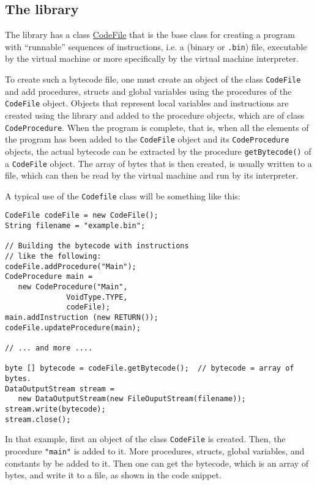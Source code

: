 \documentclass[11pt]{article}
\begin{document}
\subsection{The library}
\label{sec:org5157000}

The library has a class \href{../../../material/oblig2-patch/src/bytecode/CodeFile.java}{CodeFile} that is the base class for creating a
program with ``runnable'' sequences of instructions, i.e. a (binary or
\texttt{.bin}) file, executable by the virtual machine or more specifically by the
virtual machine interpreter.


To create such a bytecode file, one must create an object of the class
\texttt{CodeFile} and add procedures, structs and global variables using the
procedures of the \texttt{CodeFile} object. Objects that represent local variables
and instructions are created using the library and added to the procedure
objects, which are of class \texttt{CodeProcedure}. When the program is complete,
that is, when all the elements of the program has been added to the
\texttt{CodeFile} object and its \texttt{CodeProcedure} objects, the actual bytecode can
be extracted by the procedure \texttt{getBytecode()} of a \texttt{CodeFile} object.  The
array of bytes that is then created, is usually written to a file, which
can then be read by the virtual machine and run by its interpreter.



A typical use of the \texttt{Codefile} class will be something like this:



\lstset{language=java,label= ,caption= ,captionpos=b,numbers=none}
\begin{lstlisting}
CodeFile codeFile = new CodeFile();
String filename = "example.bin";

// Building the bytecode with instructions 
// like the following:
codeFile.addProcedure("Main");
CodeProcedure main = 
   new CodeProcedure("Main",
		      VoidType.TYPE,
		      codeFile);
main.addInstruction (new RETURN());
codeFile.updateProcedure(main);

// ... and more ....

byte [] bytecode = codeFile.getBytecode();  // bytecode = array of bytes.
DataOutputStream stream = 
   new DataOutputStream(new FileOuputStream(filename));
stream.write(bytecode);
stream.close();
\end{lstlisting}

In that example, first an object of the class \texttt{CodeFile} is created. Then,
the procedure \texttt{"main"} is added to it. More procedures, structs, global
variables, and constants by be added to it. Then one can get the bytecode,
which is an array of bytes, and write it to a file, as shown in the code
snippet.
\end{document}
